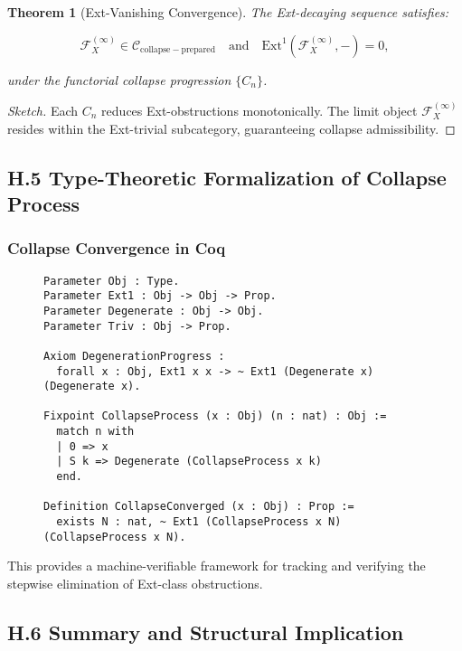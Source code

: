 \documentclass[11pt]{article}
\newtheorem{theorem}{Theorem}[section]
\begin{document}
\begin{theorem}[Ext-Vanishing Convergence]
The Ext-decaying sequence satisfies:

\[
\mathcal{F}_X^{(\infty)} \in \mathcal{C}_{\mathrm{collapse-prepared}} \quad \text{and} \quad \mathrm{Ext}^1(\mathcal{F}_X^{(\infty)}, -) = 0,
\]

under the functorial collapse progression \( \{ C_n \} \).
\end{theorem}

\begin{proof}[Sketch]
Each \( C_n \) reduces Ext-obstructions monotonically. The limit object \( \mathcal{F}_X^{(\infty)} \) resides within the Ext-trivial subcategory, guaranteeing collapse admissibility.
\end{proof}

\subsection*{H.5 Type-Theoretic Formalization of Collapse Process}

\subsubsection*{Collapse Convergence in Coq}

\begin{figure}[h]
\centering
\begin{lstlisting}[language=Coq, caption=Formal Collapse Process Encoding]
Parameter Obj : Type.
Parameter Ext1 : Obj -> Obj -> Prop.
Parameter Degenerate : Obj -> Obj.
Parameter Triv : Obj -> Prop.

Axiom DegenerationProgress :
  forall x : Obj, Ext1 x x -> ~ Ext1 (Degenerate x) (Degenerate x).

Fixpoint CollapseProcess (x : Obj) (n : nat) : Obj :=
  match n with
  | 0 => x
  | S k => Degenerate (CollapseProcess x k)
  end.

Definition CollapseConverged (x : Obj) : Prop :=
  exists N : nat, ~ Ext1 (CollapseProcess x N) (CollapseProcess x N).
\end{lstlisting}
\end{figure}

This provides a machine-verifiable framework for tracking and verifying the stepwise elimination of Ext-class obstructions.

\subsection*{H.6 Summary and Structural Implication}
\end{document}
